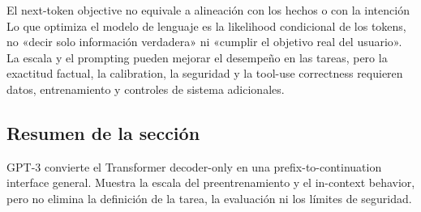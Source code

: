 
\begin{warningbox}{El next-token objective no equivale a alineación con los hechos o con la intención}
Lo que optimiza el modelo de lenguaje es la likelihood condicional de los tokens, no «decir solo información verdadera» ni «cumplir el objetivo real del usuario». La escala y el prompting pueden mejorar el desempeño en las tareas, pero la exactitud factual, la calibration, la seguridad y la tool-use correctness requieren datos, entrenamiento y controles de sistema adicionales.
\end{warningbox}

\subsection{Resumen de la sección}

GPT-3 convierte el Transformer decoder-only en una prefix-to-continuation interface general. Muestra la escala del preentrenamiento y el in-context behavior, pero no elimina la definición de la tarea, la evaluación ni los límites de seguridad.
